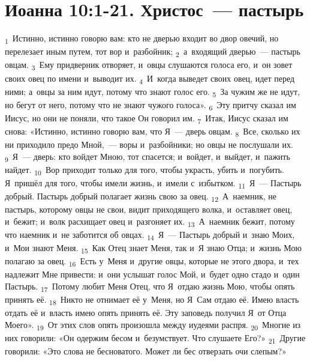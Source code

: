 \documentclass[a4paper,12pt]{article}
\begin{document}

\section{Иоанна 10:1-21. Христос~--- пастырь}

\textsubscript{1}~Истинно, истинно говорю вам: кто не дверью входит во двор овечий, но перелезает иным путем, тот вор и~разбойник;
\textsubscript{2}~а~входящий дверью~--- пастырь овцам.
\textsubscript{3}~Ему придверник отворяет, и~овцы слушаются голоса его, и~он зовет своих овец по имени и~выводит их.
\textsubscript{4}~И~когда выведет своих овец, идет перед ними; а~овцы за ним идут, потому что знают голос его.
\textsubscript{5}~За чужим же не идут, но бегут от него, потому что не знают чужого голоса».
\textsubscript{6}~Эту притчу сказал им Иисус, но они не поняли, что такое Он говорил им.
\textsubscript{7}~Итак, Иисус сказал им снова: «Истинно, истинно говорю вам, что Я~— дверь овцам.
\textsubscript{8}~Все, сколько их ни приходило предо Мной,~--- воры и~разбойники; но овцы не послушали их.
\textsubscript{9}~Я~— дверь: кто войдет Мною, тот спасется; и~войдет, и~выйдет, и~пажить найдет.
\textsubscript{10}~Вор приходит только для того, чтобы украсть, убить и~погубить. Я~пришёл для того, чтобы имели жизнь, и~имели с~избытком.
\textsubscript{11}~Я~— Пастырь добрый. Пастырь добрый полагает жизнь свою за овец.
\textsubscript{12}~А~наемник, не пастырь, которому овцы не свои, видит приходящего волка, и~оставляет овец, и~бежит; и~волк расхищает овец и~разгоняет их.
\textsubscript{13}~А~наемник бежит, потому что наемник и~не заботится об овцах.
\textsubscript{14}~Я~— Пастырь добрый и~знаю Моих, и~Мои знают Меня.
\textsubscript{15}~Как Отец знает Меня, так и~Я знаю Отца; и~жизнь Мою полагаю за овец.
\textsubscript{16}~Есть у~Меня и~другие овцы, которые не этого двора, и~тех надлежит Мне привести: и~они услышат голос Мой, и~будет одно стадо и~один Пастырь.
\textsubscript{17}~Потому любит Меня Отец, что Я~отдаю жизнь Мою, чтобы опять принять её.
\textsubscript{18}~Никто не отнимает её у~Меня, но Я~Сам отдаю её. Имею власть отдать её и~власть имею опять принять её. Эту заповедь получил Я~от Отца Моего».
\textsubscript{19}~От этих слов опять произошла между иудеями распря.
\textsubscript{20}~Многие из них говорили: «Он одержим бесом и~безумствует. Что слушаете Его?»
\textsubscript{21}~Другие говорили: «Это слова не бесноватого. Может ли бес отверзать очи слепым?» 
\end{document}
